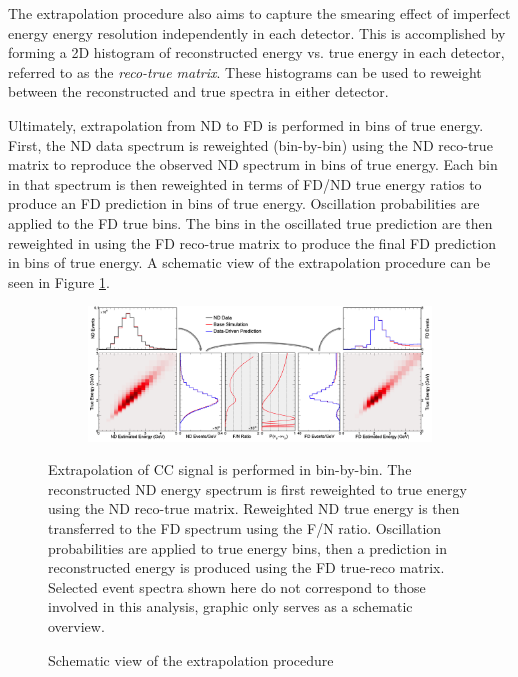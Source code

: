 The extrapolation procedure also aims to capture the smearing effect of
imperfect energy energy resolution independently in each detector.
This is accomplished by forming a 2D histogram of reconstructed energy
vs. true energy in each detector, referred to as the \textit{reco-true matrix}.
These histograms can be used to reweight between the reconstructed
and true spectra in either detector.

Ultimately, extrapolation from ND to FD is performed in bins of true energy.
First, the ND data spectrum is reweighted (bin-by-bin)
using the ND reco-true matrix
to reproduce the observed ND spectrum in bins of true energy.
Each bin in that spectrum is then reweighted in terms of FD/ND true energy
ratios to
produce an FD prediction in bins of true energy.
Oscillation probabilities are applied to the FD true bins.
The bins in the
oscillated true prediction are then reweighted in using the FD reco-true
matrix to produce the final FD prediction in bins of true energy.
A schematic view of the extrapolation procedure can be seen in Figure
\ref{extrap_fig}.

\begin{figure}
\begin{center}
  \begin{subfigure}[b]{\textwidth}
    \centering
    \includegraphics[height=0.45\textwidth, angle=-90]{figures/figures/extrap_schematic.png}
  \end{subfigure}
\end{center}
\caption{Schematic view of the extrapolation procedure}{
Extrapolation of \numu CC signal is performed in bin-by-bin.
The reconstructed ND energy spectrum is first reweighted to true energy
using the ND reco-true matrix.
Reweighted ND true energy is then transferred to the FD spectrum using the
F/N ratio.
Oscillation probabilities are applied to true energy bins,
then a prediction in reconstructed energy is produced using the
FD true-reco matrix.
Selected event spectra shown here do not correspond to those
involved in this analysis, graphic only serves as a schematic overview.
}
\label{extrap_fig}
\end{figure}

